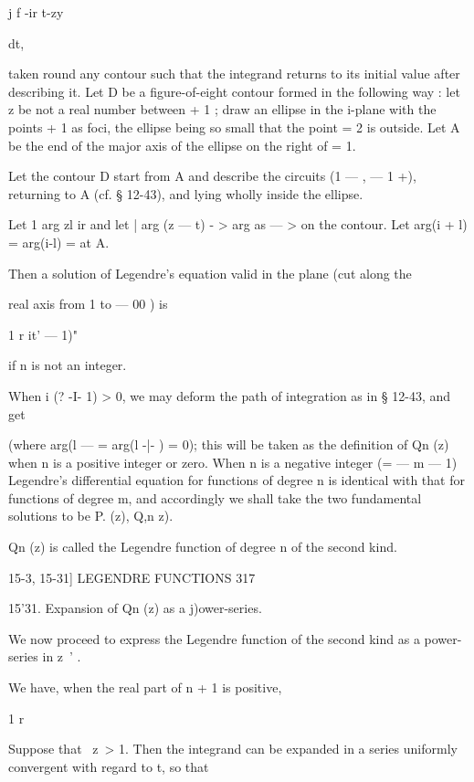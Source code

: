 {{j f -ir t-zy



dt,



taken round any contour such that the integrand returns to its initial
value after describing it. Let D be a figure-of-eight contour formed
in the following way : let z be not a real number between + 1 ; draw
an ellipse in the i-plane with the points + 1 as foci, the ellipse
being so small that the point = 2 is outside. Let A be the end of the
major axis of the ellipse on the right of = 1.

Let the contour D start from A and describe the circuits (1 — , — 1
+), returning to A (cf. § 12-43), and lying wholly inside the ellipse.

Let 1 arg zl ir and let | arg (z — t) - > arg as — > on the contour.
Let arg(i + l) = arg(i-l) = at A.

Then a solution of Legendre's equation valid in the plane (cut along
the

real axis from 1 to — 00 ) is

1 r it' — 1)"

if n is not an integer.

When i (? -I- 1) > 0, we may deform the path of integration as in §
12-43, and get

(where arg(l — = arg(l -|- ) = 0); this will be taken as the
definition of Qn (z) when n is a positive integer or zero. When n is a
negative integer (= — m — 1) Legendre's differential equation for
functions of degree n is identical with that for functions of degree
m, and accordingly we shall take the two fundamental solutions to be
P. (z), Q,n z).

Qn (z) is called the Legendre function of degree n of the second kind.



15-3, 15-31] LEGENDRE FUNCTIONS 317

15'31. Expansion of Qn (z) as a j)ower-series.

We now proceed to express the Legendre function of the second kind as
a power-series in z~' .



We have, when the real part of n + 1 is positive,

1 r



Suppose that \ z\ > 1. Then the integrand can be expanded in a series
uniformly convergent with regard to t, so that



}}
